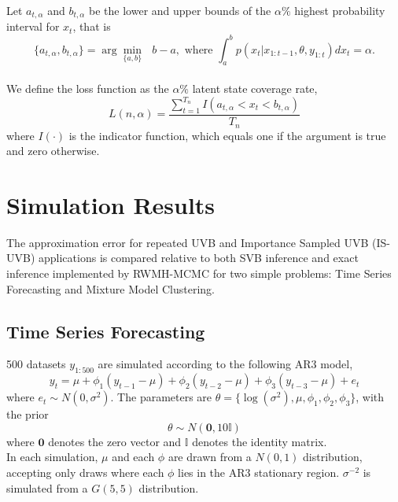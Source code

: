 \documentclass[12pt,a4paper]{article}\usepackage[]{graphicx}\usepackage[]{color}
\begin{document}
Let $a_{t, \alpha}$ and $b_{t, \alpha}$ be the lower and upper bounds of the $\alpha\%$ highest probability interval for $x_t$, that is
\begin{equation}
\label{HPI}
\{a_{t, \alpha}, b_{t, \alpha}\} = \arg \underset{\{a, b\}}{\min}\mbox{ } b - a, \mbox{ where } \int_a^b p(x_t | x_{1:t-1}, \theta, y_{1:t})dx_t = \alpha.
\end{equation}
\\

We define the loss function as the $\alpha\%$ latent state coverage rate, 
\begin{equation}
\label{coverage}
L(n, \alpha) = \frac{\sum_{t=1}^{T_n} I(a_{t, \alpha} < x_t < b_{t, \alpha})}{T_n}
\end{equation}
where $I(\cdot)$ is the indicator function, which equals one if the argument is true and zero otherwise.
\fi

\section{Simulation Results}
\label{sec:UVBSim}

The approximation error for repeated UVB and Importance Sampled UVB (IS-UVB) applications is compared relative to both SVB inference and exact inference implemented by RWMH-MCMC for two simple problems: Time Series Forecasting and Mixture Model Clustering.

\subsection{Time Series Forecasting}
\label{subsec:UVBTS}

500 datasets $y_{1:500}$ are simulated according to the following AR3 model,
\begin{equation}
\label{UVB:TSAR3}
y_t = \mu + \phi_1 (y_{t-1} - \mu) + \phi_2 (y_{t-2} - \mu) + \phi_3 (y_{t-3} - \mu) + e_t
\end{equation}
where $e_t \sim N(0, \sigma^2)$. 
The parameters are $\theta = \{\log(\sigma^2), \mu, \phi_1, \phi_2, \phi_3 \}$, with the prior
\begin{equation}
\label{UVB:TSprior}
\theta \sim N(\boldsymbol{0}, 10 \mathbb{I})
\end{equation}
where $\boldsymbol{0}$ denotes the zero vector and $\mathbb{I}$ denotes the identity matrix.
\\

In each simulation, $\mu$ and each $\phi$ are drawn from a $N(0, 1)$ distribution, accepting only draws where each $\phi$ lies in the AR3 stationary region. $\sigma^{-2}$ is simulated from a $G(5, 5)$ distribution.
\\
\end{document}
